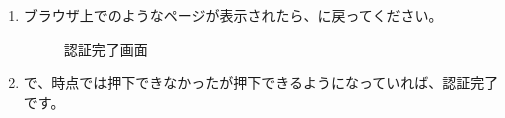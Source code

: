 \begin{enumerate}
                \newpage
                \item ブラウザ上でのようなページが表示されたら、\spotifydashboard に戻ってください。
                \label{item:spotify5}
                    \begin{figure}[htbp]
                        \centering
                            \caption{認証完了画面}
                        \label{img:spotify4}
                    \end{figure}
                \item \spotifydashboard で、時点では押下できなかったが押下できるようになっていれば、認証完了です。
            \end{enumerate}

        \newpage
